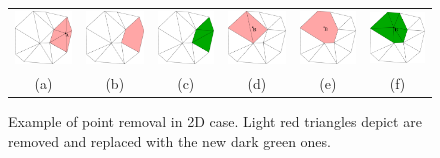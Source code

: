 \begin{figure}[t]
\centering
\begin{tabular}{cccccc}
\includegraphics[width=0.13\columnwidth]{./img//delaunayExampleMoving01}&
\includegraphics[width=0.13\columnwidth]{./img//delaunayExampleMoving02}&
\includegraphics[width=0.13\columnwidth]{./img//delaunayExampleMoving03}&
\includegraphics[width=0.13\columnwidth]{./img//delaunayExampleMoving04}&
\includegraphics[width=0.13\columnwidth]{./img//delaunayExampleMoving05}&
\includegraphics[width=0.13\columnwidth]{./img//delaunayExampleMoving06}\\
(a)&(b)&(c)&(d)&(e)&(f)
\end{tabular}
\caption{Example of point removal in 2D case. Light red triangles depict are removed and replaced with the new dark green ones.}
\label{fig:moving_ch5}
\end{figure}
% 
